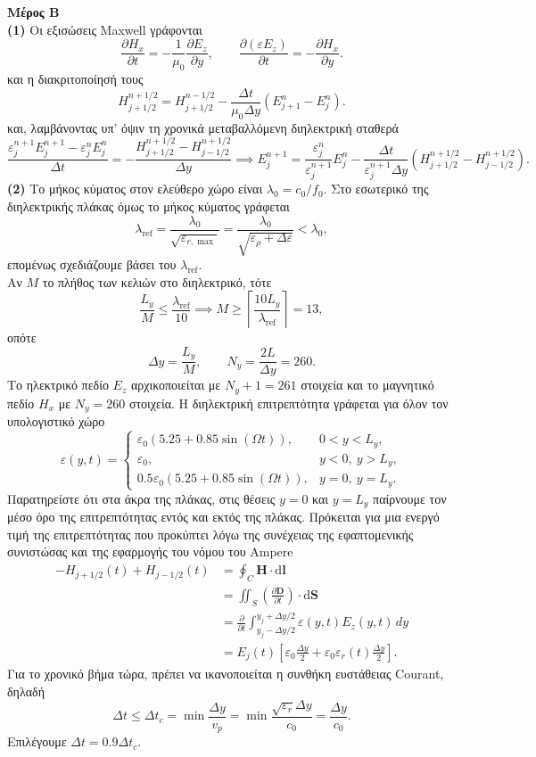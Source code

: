 \documentclass[12pt]{article}
\begin{document}
\textbf{Μέρος Β} \\
\textbf{(1)}
Οι εξισώσεις Maxwell γράφονται
\[
\frac{\partial H_x}{\partial t}
=-\frac{1}{\mu_0}\frac{\partial E_z}{\partial y},
\qquad
\frac{\partial(\varepsilon E_z)}{\partial t}
=-\frac{\partial H_x}{\partial y}.
\]
και η διακριτοποίησή τους
\[
H_{j+1/2}^{n+1/2}
=
H_{j+1/2}^{n-1/2}
-\frac{\Delta t}{\mu_0\Delta y}
\left(E_{j+1}^{n}-E_j^{n}\right).
\]
και, λαμβάνοντας υπ' όψιν τη χρονικά μεταβαλλόμενη διηλεκτρική σταθερά
\[
\frac{\varepsilon_j^{n+1}E_j^{n+1}
-\varepsilon_j^nE_j^n}{\Delta t}
=
-\frac{H_{j+1/2}^{n+1/2}-H_{j-1/2}^{n+1/2}}{\Delta y} \implies
E_j^{n+1}
=
\frac{\varepsilon_j^n}{\varepsilon_j^{n+1}}E_j^n
-\frac{\Delta t}{\varepsilon_j^{n+1}\Delta y}
\left(H_{j+1/2}^{n+1/2}-H_{j-1/2}^{n+1/2}\right).
\]
\textbf{(2)}
Το μήκος κύματος στον ελεύθερο χώρο είναι $\lambda_0 = c_0/f_0$. Στο εσωτερικό της διηλεκτρικής πλάκας όμως το μήκος κύματος γράφεται
\[
\lambda_{\text{ref}}
=\frac{\lambda_0}{\sqrt{\varepsilon_{r,\max}}}
=\frac{\lambda_0}{\sqrt{\varepsilon_\rho + \Delta \varepsilon}} < \lambda_0
,\] επομένως σχεδιάζουμε βάσει του $\lambda_\text{ref}$. \\
Αν $M$ το πλήθος των κελιών στο διηλεκτρικό, τότε
\[\dfrac{L_y}{M} \leq \frac{\lambda_\text{ref}}{10} \implies
M \geq \left\lceil \frac{10 L_y}{\lambda_\text{ref}}\right\rceil = 13
,\] οπότε
\[
\Delta y = \frac{L_y}{M}, \qquad N_y = \frac{2L}{\Delta y} = 260
.\]
Το ηλεκτρικό πεδίο $E_z$ αρχικοποιείται με $N_y + 1 = 261$ στοιχεία και το μαγνητικό πεδίο $H_x$ με $N_y = 260$ στοιχεία.
Η διηλεκτρική επιτρεπτότητα γράφεται για όλον τον υπολογιστικό χώρο
\[
\varepsilon(y,t)=
\begin{cases}
\varepsilon_0\left(5.25+0.85\sin(\Omega t)\right),
&0<y<L_y,\\
\varepsilon_0,&y<0,\: y>L_y, \\
0.5\varepsilon_0\left(5.25+0.85\sin(\Omega t)\right),
&y=0,\: y=L_y.
\end{cases}
\]
Παρατηρείστε ότι στα άκρα της πλάκας, στις θέσεις $y = 0$ και $y = L_y$ παίρνουμε τον μέσο όρο της επιτρεπτότητας εντός και εκτός της πλάκας. Πρόκειται για μια ενεργό τιμή της επιτρεπτότητας που προκύπτει λόγω της συνέχειας της εφαπτομενικής συνιστώσας και της εφαρμογής του νόμου του Ampere
\begin{align*}
-H_{j+1/2}(t)+H_{j-1/2}(t) &=
\oint_C \mathbf{H} \cdot \text{d} \boldsymbol{l} \\
&=  \iint_S \left(\frac{\partial \mathbf{D}}{\partial t} \right) \cdot \text{d} \mathbf{S} \\
&=\frac{\partial}{\partial t} \int_{y_j-\Delta y/2}^{y_j+\Delta y/2} \varepsilon(y,t)E_z(y,t)\,dy \\
&= E_j(t)\left[\varepsilon_0\frac{\Delta y}{2}+\varepsilon_0\varepsilon_r(t)\frac{\Delta y}{2}\right].
\end{align*}
Για το χρονικό βήμα τώρα, πρέπει να ικανοποιείται η συνθήκη ευστάθειας Courant, δηλαδή
\[\Delta t \leq \Delta t_c = \min\frac{\Delta y}{v_p} = \min \frac{\sqrt{\varepsilon_r} \Delta y}{c_0} = \frac{\Delta y}{c_0}.
\]
Επιλέγουμε $\Delta t = 0.9 \Delta t_c$. \\
\end{document}
